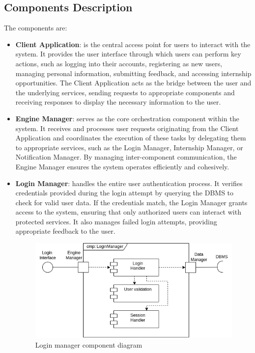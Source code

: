 \subsection{Components Description}
\label{sec:component_diagram}
The components are:
\begin{itemize}
    \item \textbf{Client Application}: is the central access point for users to interact with the system. It provides the user interface through which users can perform key actions, such as logging into their accounts, registering as new users, managing personal information, submitting feedback, and accessing internship opportunities. The Client Application acts as the bridge between the user and the underlying services, sending requests to appropriate components and receiving responses to display the necessary information to the user.
    \item \textbf{Engine Manager}: serves as the core orchestration component within the system. It receives and processes user requests originating from the Client Application and coordinates the execution of these tasks by delegating them to appropriate services, such as the Login Manager, Internship Manager, or Notification Manager. By managing inter-component communication, the Engine Manager ensures the system operates efficiently and cohesively.
    \item \textbf{Login Manager}: handles the entire user authentication process. It verifies credentials provided during the login attempt by querying the DBMS to check for valid user data. If the credentials match, the Login Manager grants access to the system, ensuring that only authorized users can interact with protected services. It also manages failed login attempts, providing appropriate feedback to the user.

    \begin{figure}[H]
        \centering
        \includegraphics[width=0.9\linewidth]{Images/Component diagrams/ComponentDiagram_Login.png}
        \caption{Login manager component diagram}
        \label{fig:enter-label}
    \end{figure}
    

\end{itemize}
